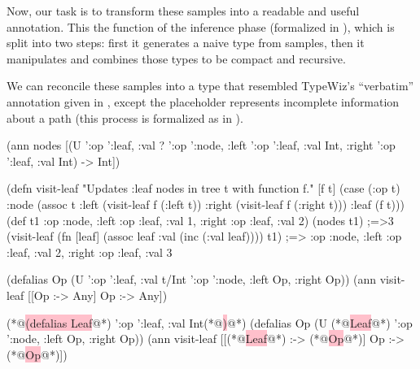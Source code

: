 Now, our task is to transform these samples into a readable and useful annotation.
This the function of the inference phase (formalized in ),
which is split into two steps: first it generates a naive type from samples, then it
manipulates and combines those types to be compact and recursive.

We can reconcile these samples into a type that resembled TypeWiz's
``verbatim'' annotation given in , except
the  placeholder represents incomplete information about a path
(this process is formalized as \generatetenv{} in ).

\begin{cljlisting}
(ann nodes [(U '{:op ':leaf, :val ?} '{:op ':node,
                                       :left '{:op ':leaf, :val Int},
                                       :right '{:op ':leaf, :val Int}}) -> Int])
\end{cljlisting}


\begin{cljlisting}
(defn visit-leaf "Updates :leaf nodes in tree t with function f."
  [f t] (case (:op t)
          :node (assoc t :left (visit-leaf f (:left t))
                         :right (visit-leaf f (:right t)))
          :leaf (f t)))
(def t1 {:op :node, :left {:op :leaf, :val 1}, :right {:op :leaf, :val 2}})
(nodes t1)  ;=>3
(visit-leaf (fn [leaf] (assoc leaf :val (inc (:val leaf)))) t1)
;=> {:op :node, :left {:op :leaf, :val 2}, :right {:op :leaf, :val 3}}
\end{cljlisting}

\begin{cljlisting}
(defalias Op (U '{:op ':leaf, :val t/Int} '{:op ':node, :left Op, :right Op}))
(ann visit-leaf [[Op :-> Any] Op :-> Any])
\end{cljlisting}

\begin{cljlisting}
(*@\colorbox{pink}{(defalias Leaf}@*) '{:op ':leaf, :val Int}(*@\colorbox{pink}{)}@*)
(defalias Op (U (*@\colorbox{pink}{Leaf}@*) '{:op ':node, :left Op, :right Op}))
(ann visit-leaf [[(*@\colorbox{pink}{Leaf}@*) :-> (*@\colorbox{pink}{Op}@*)] Op :-> (*@\colorbox{pink}{Op}@*)])
\end{cljlisting}
